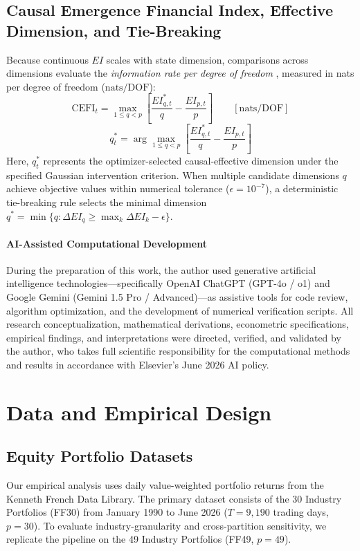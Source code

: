 \documentclass[review,12pt,authoryear]{elsarticle}
\begin{document}
\subsection{Causal Emergence Financial Index, Effective Dimension, and Tie-Breaking}
Because continuous $EI$ scales with state dimension, comparisons across dimensions evaluate the \emph{information rate per degree of freedom} \citep{liu2024exact}, measured in nats per degree of freedom ($\mathrm{nats/DOF}$):
\begin{equation}
\mathrm{CEFI}_t = \max_{1 \le q < p} \left[ \frac{EI_{q,t}^*}{q} - \frac{EI_{p,t}}{p} \right] \qquad [\mathrm{nats/DOF}]
\label{eq:cefi_def}
\end{equation}
\begin{equation}
q_t^* = \arg\max_{1 \le q < p} \left[ \frac{EI_{q,t}^*}{q} - \frac{EI_{p,t}}{p} \right]
\label{eq:q_star_def}
\end{equation}
Here, $q_t^*$ represents the optimizer-selected causal-effective dimension under the specified Gaussian intervention criterion. When multiple candidate dimensions $q$ achieve objective values within numerical tolerance ($\epsilon = 10^{-7}$), a deterministic tie-breaking rule selects the minimal dimension $q^* = \min \{ q : \Delta EI_q \ge \max_{k} \Delta EI_k - \epsilon \}$.

\paragraph{AI-Assisted Computational Development}
During the preparation of this work, the author used generative artificial intelligence technologies—specifically OpenAI ChatGPT (GPT-4o / o1) and Google Gemini (Gemini 1.5 Pro / Advanced)—as assistive tools for code review, algorithm optimization, and the development of numerical verification scripts. All research conceptualization, mathematical derivations, econometric specifications, empirical findings, and interpretations were directed, verified, and validated by the author, who takes full scientific responsibility for the computational methods and results in accordance with Elsevier's June 2026 AI policy.

\section{Data and Empirical Design}
\label{sec:data}

\subsection{Equity Portfolio Datasets}
Our empirical analysis uses daily value-weighted portfolio returns from the Kenneth French Data Library. The primary dataset consists of the 30 Industry Portfolios (FF30) from January 1990 to June 2026 ($T = 9,190$ trading days, $p = 30$). To evaluate industry-granularity and cross-partition sensitivity, we replicate the pipeline on the 49 Industry Portfolios (FF49, $p=49$).
\end{document}
